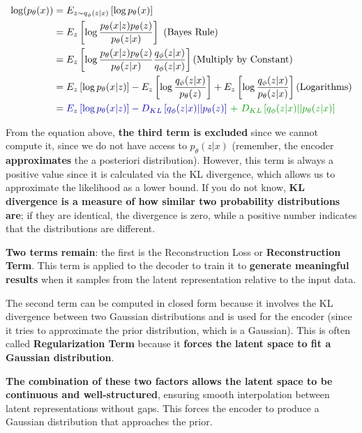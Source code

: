 \begin{equation*} 
\begin{aligned}
\log (p_{\theta}(x)) &= E_{z \sim q_{\phi}(z|x)}\left[ \log p_{\theta}(x) \right]\\
&=E_{z }\left[ \log \frac{p_{\theta}(x|z) p_{\theta}(z)}{p_{\theta}(z|x)} \right]  \text{  (Bayes Rule)} \\
&=E_{z }\left[ \log \frac{p_{\theta}(x|z) p_{\theta}(z)}{p_{\theta}(z|x)} \frac{q_{\phi}(z|x) }{q_{\phi}(z|x)}\right] \text{(Multiply by Constant)} \\
&=E_{z }\left[ \log p_{\theta}(x|z) \right] - E_{z} \left[ \log \frac{q_{\phi}(z|x)}{ p_{\theta}(z)}\right] + E_{z} \left[ \log \frac{q_{\phi}(z|x)}{p_{\theta}(z|x)} \right]  \text{(Logarithms)} \\
&=\textcolor{mybluee}{E_{z }\left[ \log p_{\theta}(x|z) \right] - D_{KL} \left[ q_{\phi}(z|x)|| p_{\theta}(z)\right]}\textcolor{mygreen}{\ + \ D_{KL} \left[ q_{\phi}(z|x)||p_{\theta}(z|x) \right]} 
\end{aligned}
\end{equation*}

From the equation above, \textbf{\textcolor{mygreen}{the third term is excluded}} since we cannot compute it, since we do not have access to $p_{\theta}(z|x)$ (remember, the encoder \textbf{approximates} the a posteriori distribution). However, this term is always a positive value since it is calculated via the KL divergence, which allows us to approximate the likelihood as a lower bound. If you do not know, \textbf{KL divergence is a measure of how similar two probability distributions are}; if they are identical, the divergence is zero, while a positive number indicates that the distributions are different.

\textbf{\textcolor{mybluee}{Two terms remain}}: the first is the Reconstruction Loss or \textbf{\textcolor{mybluee}{Reconstruction Term}}. This term is applied to the decoder to train it to \textbf{generate meaningful results} when it samples from the latent representation relative to the input data.

The second term can be computed in closed form because it involves the KL divergence between two Gaussian distributions and is used for the encoder (since it tries to approximate the prior distribution, which is a Gaussian). This is often called \textbf{\textcolor{mybluee}{Regularization Term}} because it \textbf{forces the latent space to fit a Gaussian distribution}.

\textbf{The combination of these two factors allows the latent space to be continuous and well-structured}, ensuring smooth interpolation between latent representations without gaps. This forces the encoder to produce a Gaussian distribution that approaches the prior.

